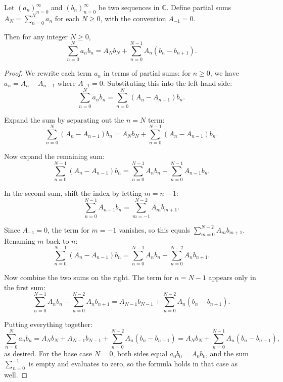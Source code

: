\begin{lemma} \label{lemma:summation_by_parts_for_sequences}
    Let $(a_n)_{n=0}^\infty$ and $(b_n)_{n=0}^\infty$ be two sequences in $\mathbb{C}$. Define partial sums $A_N = \sum_{n=0}^N a_n$ for each $N \geq 0$, with the convention $A_{-1} = 0$.

    Then for any integer $N \geq 0$,
    $$\sum_{n=0}^N a_n b_n = A_N b_N + \sum_{n=0}^{N-1} A_n (b_n - b_{n+1}).$$
\end{lemma}

\begin{proof}
    We rewrite each term $a_n$ in terms of partial sums: for $n \geq 0$, we have $a_n = A_n - A_{n-1}$ where $A_{-1} = 0$. Substituting this into the left-hand side:
    $$\sum_{n=0}^N a_n b_n = \sum_{n=0}^N (A_n - A_{n-1}) b_n.$$

    Expand the sum by separating out the $n = N$ term:
    $$\sum_{n=0}^N (A_n - A_{n-1}) b_n = A_N b_N + \sum_{n=0}^{N-1} (A_n - A_{n-1}) b_n.$$

    Now expand the remaining sum:
    $$\sum_{n=0}^{N-1} (A_n - A_{n-1}) b_n = \sum_{n=0}^{N-1} A_n b_n - \sum_{n=0}^{N-1} A_{n-1} b_n.$$

    In the second sum, shift the index by letting $m = n - 1$:
    $$\sum_{n=0}^{N-1} A_{n-1} b_n = \sum_{m=-1}^{N-2} A_m b_{m+1}.$$

    Since $A_{-1} = 0$, the term for $m = -1$ vanishes, so this equals $\sum_{m=0}^{N-2} A_m b_{m+1}$. Renaming $m$ back to $n$:
    $$\sum_{n=0}^{N-1} (A_n - A_{n-1}) b_n = \sum_{n=0}^{N-1} A_n b_n - \sum_{n=0}^{N-2} A_n b_{n+1}.$$

    Now combine the two sums on the right. The term for $n = N-1$ appears only in the first sum:
    $$\sum_{n=0}^{N-1} A_n b_n - \sum_{n=0}^{N-2} A_n b_{n+1} = A_{N-1} b_{N-1} + \sum_{n=0}^{N-2} A_n (b_n - b_{n+1}).$$

    Putting everything together:
    $$\sum_{n=0}^N a_n b_n = A_N b_N + A_{N-1} b_{N-1} + \sum_{n=0}^{N-2} A_n (b_n - b_{n+1}) = A_N b_N + \sum_{n=0}^{N-1} A_n (b_n - b_{n+1}),$$
    as desired. For the base case $N = 0$, both sides equal $a_0 b_0 = A_0 b_0$, and the sum $\sum_{n=0}^{-1}$ is empty and evaluates to zero, so the formula holds in that case as well.
\end{proof}
